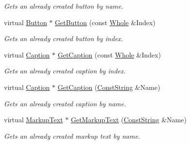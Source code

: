 \begin{DoxyCompactItemize}
\begin{DoxyCompactList}\small\item\em Gets an already created button by name. \item\end{DoxyCompactList}\item 
virtual \hyperlink{classMezzanine_1_1UI_1_1Button}{Button} $\ast$ \hyperlink{classMezzanine_1_1UI_1_1RenderableContainerWidget_ae18a59c3a4eee8dcba28229e6ada33bc}{GetButton} (const \hyperlink{namespaceMezzanine_adcbb6ce6d1eb4379d109e51171e2e493}{Whole} \&Index)
\begin{DoxyCompactList}\small\item\em Gets an already created button by index. \item\end{DoxyCompactList}\item 
virtual \hyperlink{classMezzanine_1_1UI_1_1Caption}{Caption} $\ast$ \hyperlink{classMezzanine_1_1UI_1_1RenderableContainerWidget_acdf3614fc900c3b33055f95cd9ba654c}{GetCaption} (const \hyperlink{namespaceMezzanine_adcbb6ce6d1eb4379d109e51171e2e493}{Whole} \&Index)
\begin{DoxyCompactList}\small\item\em Gets an already created caption by index. \item\end{DoxyCompactList}\item 
virtual \hyperlink{classMezzanine_1_1UI_1_1Caption}{Caption} $\ast$ \hyperlink{classMezzanine_1_1UI_1_1RenderableContainerWidget_aa6c02feb49937d38bd265a2a808e6a57}{GetCaption} (\hyperlink{namespaceMezzanine_a63cd699ac54b73953f35ec9cfc05e506}{ConstString} \&Name)
\begin{DoxyCompactList}\small\item\em Gets an already created caption by name. \item\end{DoxyCompactList}\item 
virtual \hyperlink{classMezzanine_1_1UI_1_1MarkupText}{MarkupText} $\ast$ \hyperlink{classMezzanine_1_1UI_1_1RenderableContainerWidget_ab37d9833f73a80cafc72d9b1b0a57c36}{GetMarkupText} (\hyperlink{namespaceMezzanine_a63cd699ac54b73953f35ec9cfc05e506}{ConstString} \&Name)
\begin{DoxyCompactList}\small\item\em Gets an already created markup text by name. \item\end{DoxyCompactList}\item 

\end{DoxyCompactItemize}
